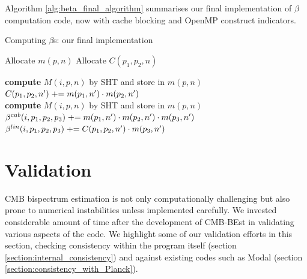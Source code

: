 Algorithm \ref{alg:beta_final_algorithm} summarises our final implementation of $\beta$ computation code, now with cache blocking and OpenMP construct indicators.

\begin{algorithm}[htbp]
	\caption{Computing $\beta$s: our final implementation}
	\label{alg:beta_final_algorithm}
	\begin{algorithmic}[1] %
		\State Allocate $m(p,n)$ 
		\State Allocate $C(p_1,p_2,n)$ 
		\\

		\State \textbf{compute} $M(i,p,n)$ by SHT and store in $m(p,n)$
		\EndFor
		\\
		\State $C(p_1,p_2,n') \mathrel{+}= m(p_1,n') \cdot m(p_2,n')$
		\EndFor
		\EndFor
		\EndFor
		\EndFor
		\\
		\State \textbf{compute} $M(i,p,n)$ by SHT and store in $m(p,n)$
		\EndFor
		\\
		\State $\beta^{cub}(i, p_1, p_2, p_3) \mathrel{+}= m(p_1,n') \cdot m(p_2,n') \cdot m(p_3,n')$
		\State $\beta^{lin}(i, p_1, p_2, p_3) \mathrel{+}= C(p_1, p_2, n') \cdot m( p_3, n')$
		\EndFor
		\EndFor
		\EndFor
		\EndFor
	\end{algorithmic}
\end{algorithm}

\section{Validation} \label{section:validation}

CMB bispectrum estimation is not only computationally challenging but also prone to numerical instabilities unless implemented carefully. We invested considerable amount of time after the development of CMB-BEst in validating various aspects of the code. We highlight some of our validation efforts in this section, checking consistency within the program itself (section \ref{section:internal_consistency}) and against existing codes such as Modal \cite{Fergusson2012} (section \ref{section:consistency_with_Planck}).

